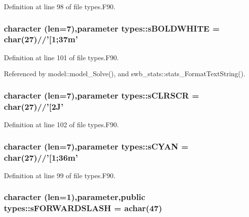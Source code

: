 Definition at line 98 of file types.F90.

\hypertarget{namespacetypes_aefdf6f19388973d1aa8709be595c7c32}{
\subsubsection[{sBOLDWHITE}]{\setlength{\rightskip}{0pt plus 5cm}character (len=7),parameter {\bf types::sBOLDWHITE} = char(27)//'\mbox{[}1;37m'}}
\label{namespacetypes_aefdf6f19388973d1aa8709be595c7c32}


Definition at line 101 of file types.F90.



Referenced by model::model\_\-Solve(), and swb\_\-stats::stats\_\-FormatTextString().

\hypertarget{namespacetypes_a92bb3d719410aa879a5823ffc5c3f647}{
\subsubsection[{sCLRSCR}]{\setlength{\rightskip}{0pt plus 5cm}character (len=7),parameter {\bf types::sCLRSCR} = char(27)//'\mbox{[}2J'}}
\label{namespacetypes_a92bb3d719410aa879a5823ffc5c3f647}


Definition at line 102 of file types.F90.

\hypertarget{namespacetypes_a9bd2b67f7cec3b5778aa09574fa71152}{
\subsubsection[{sCYAN}]{\setlength{\rightskip}{0pt plus 5cm}character (len=7),parameter {\bf types::sCYAN} = char(27)//'\mbox{[}1;36m'}}
\label{namespacetypes_a9bd2b67f7cec3b5778aa09574fa71152}


Definition at line 99 of file types.F90.

\hypertarget{namespacetypes_a75630efc0939bd3b2b2c5913d58c55f4}{
\subsubsection[{sFORWARDSLASH}]{\setlength{\rightskip}{0pt plus 5cm}character (len=1),parameter,public {\bf types::sFORWARDSLASH} = achar(47)}}
\label{namespacetypes_a75630efc0939bd3b2b2c5913d58c55f4}


